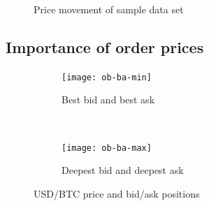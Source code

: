 \begin{figure}[H]
    \centering
    \caption{Price movement of sample data set}
    \label{fig:data-price-movement}
\end{figure}

\subsection{Importance of order prices}
\label{sec:data-hypthesis-order-price}

\begin{figure}[H]
    \centering
    \begin{subfigure}[b]{0.45\textwidth}
        \texttt{[image: ob-ba-min]}
        \caption{Best bid and best ask}
        \label{fig:ob-ba-min}
    \end{subfigure}
    ~ %
    \begin{subfigure}[b]{0.45\textwidth}
        \texttt{[image: ob-ba-max]}
        \caption{Deepest bid and deepest ask}
        \label{fig:ob-ba-max}
    \end{subfigure}
    \caption{USD/BTC price and bid/ask positions}\label{fig:animals}
\end{figure}

